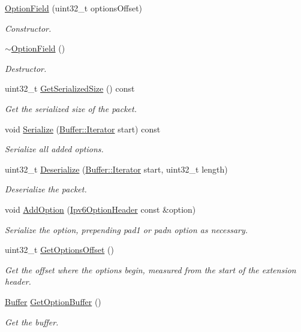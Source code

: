 \begin{DoxyCompactItemize}
\item 
\hyperlink{classns3_1_1OptionField_acb9b40ef96ba6d0f349eada45fa20efa}{Option\+Field} (uint32\+\_\+t options\+Offset)
\begin{DoxyCompactList}\small\item\em Constructor. \end{DoxyCompactList}\item 
\hyperlink{classns3_1_1OptionField_a64b10a5e633329e718350c393df70226}{$\sim$\+Option\+Field} ()
\begin{DoxyCompactList}\small\item\em Destructor. \end{DoxyCompactList}\item 
uint32\+\_\+t \hyperlink{classns3_1_1OptionField_a7ed57dda4ddd5f4409ffb692594fb924}{Get\+Serialized\+Size} () const 
\begin{DoxyCompactList}\small\item\em Get the serialized size of the packet. \end{DoxyCompactList}\item 
void \hyperlink{classns3_1_1OptionField_a9cd4cd7b17a7e443a17dcfcfadef4c28}{Serialize} (\hyperlink{classns3_1_1Buffer_1_1Iterator}{Buffer\+::\+Iterator} start) const 
\begin{DoxyCompactList}\small\item\em Serialize all added options. \end{DoxyCompactList}\item 
uint32\+\_\+t \hyperlink{classns3_1_1OptionField_a8df2abe90be59cebdcca83b1e1708ba5}{Deserialize} (\hyperlink{classns3_1_1Buffer_1_1Iterator}{Buffer\+::\+Iterator} start, uint32\+\_\+t length)
\begin{DoxyCompactList}\small\item\em Deserialize the packet. \end{DoxyCompactList}\item 
void \hyperlink{classns3_1_1OptionField_aa6a592f9fd65421ce1176ce4fa50826a}{Add\+Option} (\hyperlink{classns3_1_1Ipv6OptionHeader}{Ipv6\+Option\+Header} const \&option)
\begin{DoxyCompactList}\small\item\em Serialize the option, prepending pad1 or padn option as necessary. \end{DoxyCompactList}\item 
uint32\+\_\+t \hyperlink{classns3_1_1OptionField_ac78063bc75429ecf470b45e657e3c4d3}{Get\+Options\+Offset} ()
\begin{DoxyCompactList}\small\item\em Get the offset where the options begin, measured from the start of the extension header. \end{DoxyCompactList}\item 
\hyperlink{classns3_1_1Buffer}{Buffer} \hyperlink{classns3_1_1OptionField_a6992fa49019dfc1efbb6a8215db0e72a}{Get\+Option\+Buffer} ()
\begin{DoxyCompactList}\small\item\em Get the buffer. \end{DoxyCompactList}\end{DoxyCompactItemize}
